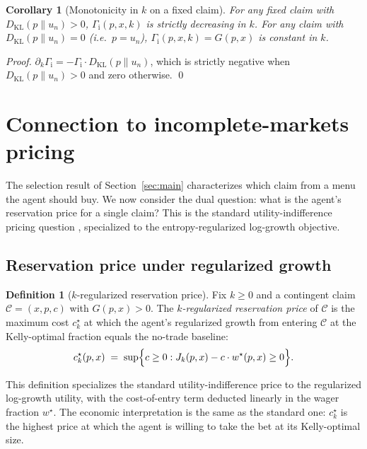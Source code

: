 \documentclass[11pt]{article}
\newtheorem{corollary}[theorem]{Corollary}
\theoremstyle{definition}
\newtheorem{definition}[theorem]{Definition}
\theoremstyle{remark}
\newcommand{\C}{\mathcal{C}}
\newcommand{\KL}{D_{\mathrm{KL}}}
\newcommand{\GROUND}{\Gamma_{\mathrm{i}}}
\begin{document}
\begin{corollary}[Monotonicity in $k$ on a fixed claim]
\label{cor:monotone-k}
For any fixed claim with $\KL(p \| u_n) > 0$,
$\GROUND(p, x, k)$ is strictly decreasing in $k$. For any claim with
$\KL(p \| u_n) = 0$ (i.e.\ $p = u_n$), $\GROUND(p, x, k) = G(p, x)$ is
constant in $k$.
\end{corollary}

\begin{proof}
$\partial_k \GROUND = -\GROUND \cdot \KL(p \| u_n)$, which
is strictly negative when $\KL(p \| u_n) > 0$ and zero otherwise.
\qed
\end{proof}


\section{Connection to incomplete-markets pricing}\label{sec:pricing}

The selection result of Section~\ref{sec:main} characterizes which
claim from a menu the agent should buy. We now consider the dual
question: what is the agent's reservation price for a single claim?
This is the standard utility-indifference pricing question
\citep{rouge2000,delbaen2002}, specialized to the entropy-regularized
log-growth objective.

\subsection{Reservation price under regularized growth}

\begin{definition}[$k$-regularized reservation price]\label{def:reservation}
Fix $k \ge 0$ and a contingent claim $\C = (x, p, c)$ with
$G(p, x) > 0$. The \emph{$k$-regularized reservation price} of $\C$ is
the maximum cost $c^\star_k$ at which the agent's regularized
growth from entering $\C$ at the Kelly-optimal fraction equals the
no-trade baseline:
\begin{equation}
c^\star_k(p, x) \;=\; \sup \Bigl\{ c \ge 0 : J_k(p, x) - c \cdot w^\star(p, x)
    \ge 0 \Bigr\}.
\label{eq:reservation}
\end{equation}
\end{definition}

This definition specializes the standard utility-indifference price to
the regularized log-growth utility, with the cost-of-entry term
deducted linearly in the wager fraction $w^\star$. The economic
interpretation is the same as the standard one: $c^\star_k$ is the
highest price at which the agent is willing to take the bet at its
Kelly-optimal size.
\end{document}
